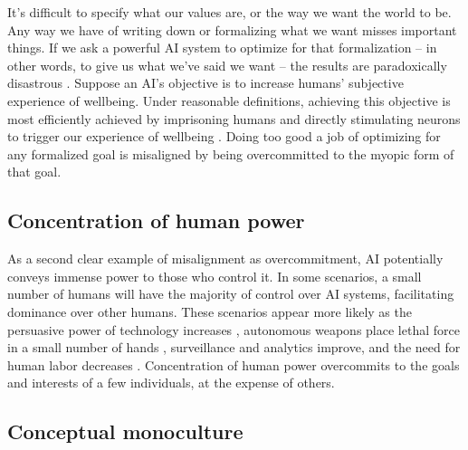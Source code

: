 \documentclass[12pt]{article}
\begin{document}
It's difficult to specify what our values are, or the way we want the world to be. Any way we have of writing down or formalizing what we want misses important things. If we ask a powerful AI system to optimize for that formalization -- in other words, to give us what we've said we want -- the results are paradoxically disastrous \citep{krakovna2020specification, russell2019human, grossman1986costs, hadfield2019incomplete, zhuang2020consequences, gabriel2020artificial, wiener1960some, amodei2016concrete}. Suppose an AI's objective is to increase humans' subjective experience of wellbeing. Under reasonable definitions, achieving this objective is most efficiently achieved by imprisoning humans and directly stimulating neurons to trigger our experience of wellbeing \citep{bostrom2014superintelligence}. Doing too good a job of optimizing for any formalized goal is misaligned by being overcommitted to the myopic form of that goal.


\subsection{Concentration of human power} 

As a second clear example of misalignment as overcommitment, AI potentially conveys immense power to those who control it. In some scenarios, a small number of humans will have the majority of control over AI systems, facilitating dominance over other humans. These scenarios appear more likely as the persuasive power of technology increases \citep{woolley2018computational, costello2024durably, hackenburg2025levers}, autonomous weapons place lethal force in a small number of hands \citep{scharre2018army}, surveillance and analytics improve, and the need for human labor decreases \citep{susskind2020world, ford2015rise, drago2025defining}. Concentration of human power overcommits to the goals and interests of a few individuals, at the expense of others.

\subsection{Conceptual monoculture}
\end{document}

